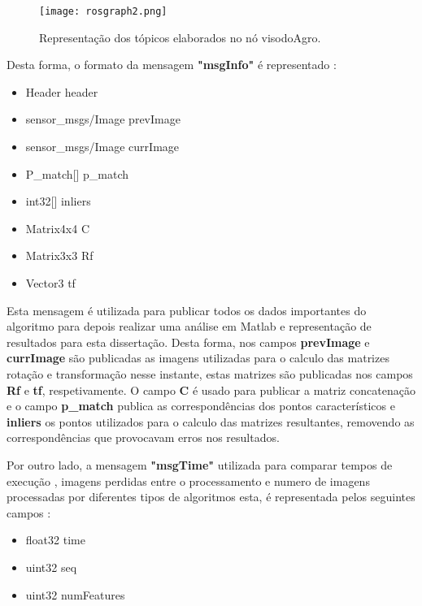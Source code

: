 	\begin{figure}[h!] %
		\begin{center}
			\leavevmode		
			\texttt{[image: rosgraph2.png]}
			\caption{Representação dos tópicos elaborados no nó visodoAgro.}
			\label{fig:rosgraph}
		\end{center}
	\end{figure}
	
	Desta forma, o formato da mensagem \textbf{"msgInfo"} é representado : 
	\begin{itemize}
		\item Header header
		
		\item sensor\_msgs/Image prevImage
		\item sensor\_msgs/Image currImage
		
		\item P\_match[] p\_match	
		\item int32[] inliers
	
		\item Matrix4x4 C
		\item Matrix3x3 Rf
		\item Vector3 tf
		
	\end{itemize}

	
	Esta mensagem é utilizada para publicar todos os dados importantes do algoritmo para depois realizar uma análise em Matlab e representação de resultados para esta dissertação. 
	Desta forma, nos campos \textbf{prevImage} e \textbf{currImage} são publicadas as imagens utilizadas para o calculo das matrizes rotação e transformação nesse instante, estas matrizes são publicadas nos campos \textbf{Rf} e \textbf{tf}, respetivamente. O campo \textbf{C} é usado para publicar a matriz concatenação e o campo \textbf{p\_match} publica as correspondências dos pontos característicos e \textbf{inliers} os pontos utilizados para o calculo das matrizes resultantes, removendo as correspondências que provocavam erros nos resultados.  
	
	
	Por outro lado, a mensagem \textbf{"msgTime"} utilizada para comparar tempos de execução , imagens perdidas entre o processamento e numero de imagens processadas por diferentes tipos de algoritmos esta, é representada pelos seguintes campos :
	\begin{itemize}
		\item float32 time
		
		\item uint32 seq
		\item uint32 numFeatures
	\end{itemize}
	
